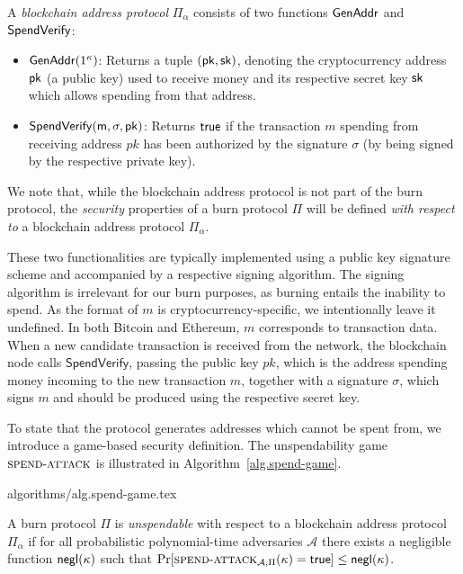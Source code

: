 \begin{definition}
  A \emph{blockchain address protocol} $\Pi_\alpha$ consists of two functions $\mathsf{GenAddr}$ and $\sf{SpendVerify}$:

  \begin{itemize}
    \item $\mathsf{GenAddr}(1^\kappa)$: Returns a tuple $(\sf{pk}, \sf{sk})$, denoting the cryptocurrency address $\sf{pk}$ (a public key) used to receive money and its respective secret key $\sf{sk}$ which allows spending from that address.

    \item $\sf{SpendVerify}(m, \sigma, pk)$: Returns $\sf{true}$ if the transaction $m$ spending from receiving address $pk$ has been authorized by the signature $\sigma$ (by being signed by the respective private key).
  \end{itemize}
\end{definition}

We note that, while the blockchain address protocol is not part of the burn protocol, the \emph{security} properties of a burn protocol $\Pi$ will be defined \emph{with respect to} a blockchain address protocol $\Pi_\alpha$.

These two functionalities are typically implemented using a public key signature scheme and accompanied by a respective signing algorithm. The signing algorithm is irrelevant for our burn purposes, as burning entails the inability to spend. As the format of $m$ is cryptocurrency-specific, we intentionally leave it undefined. In both Bitcoin and Ethereum, $m$ corresponds to transaction data. When a new candidate transaction is received from the network, the blockchain node calls $\textsf{SpendVerify}$, passing the public key $pk$, which is the address spending money incoming to the new transaction $m$, together with a signature $\sigma$, which signs $m$ and should be produced using the respective secret key.

To state that the protocol generates addresses which cannot be spent from, we introduce a game-based security definition. The unspendability game $\textsc{spend}\-\text{-}\-\textsc{attack}$ is illustrated in Algorithm~\ref{alg.spend-game}.

{algorithms/alg.spend-game.tex}

\begin{definition}[Unspendability]
  A burn protocol $\Pi$ is \emph{unspendable} with respect to a blockchain address protocol $\Pi_\alpha$ if
  for all probabilistic polynomial-time adversaries $\mathcal{A}$ there exists a negligible function $\textsf{negl}(\kappa)$ such that
  $
    \Pr[\textsc{spend}\-\text{-}\-\textsc{attack}_{\mathcal{A}, \Pi}(\kappa) = \textsf{true}] \leq \textsf{negl}(\kappa)
  $.
\end{definition}

